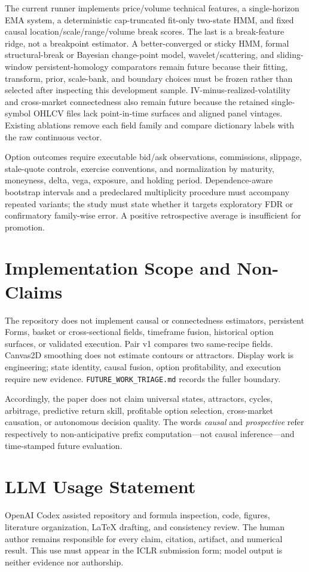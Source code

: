 \documentclass{article}
\begin{document}
The current runner implements price/volume technical features, a single-horizon EMA system, a deterministic cap-truncated fit-only two-state HMM, and fixed causal location/scale/range/volume break scores. The last is a break-feature ridge, not a breakpoint estimator. A better-converged or sticky HMM, formal structural-break or Bayesian change-point model, wavelet/scattering, and sliding-window persistent-homology comparators \citep{pereaharer2015sliding,gideakatz2018tda} remain future because their fitting, transform, prior, scale-bank, and boundary choices must be frozen rather than selected after inspecting this development sample. IV-minus-realized-volatility and cross-market connectedness also remain future because the retained single-symbol OHLCV files lack point-in-time surfaces and aligned panel vintages. Existing ablations remove each field family and compare dictionary labels with the raw continuous vector.

Option outcomes require executable bid/ask observations, commissions, slippage, stale-quote controls, exercise conventions, and normalization by maturity, moneyness, delta, vega, exposure, and holding period. Dependence-aware bootstrap intervals and a predeclared multiplicity procedure must accompany repeated variants; the study must state whether it targets exploratory FDR or confirmatory family-wise error. A positive retrospective average is insufficient for promotion.

\section{Implementation Scope and Non-Claims}

The repository does not implement causal or connectedness estimators, persistent Forms, basket or cross-sectional fields, timeframe fusion, historical option surfaces, or validated execution. Pair v1 compares two same-recipe fields. Canvas2D smoothing does not estimate contours or attractors. Display work is engineering; state identity, causal fusion, option profitability, and execution require new evidence. \texttt{FUTURE\_WORK\_TRIAGE.md} records the fuller boundary.

Accordingly, the paper does not claim universal states, attractors, cycles, arbitrage, predictive return skill, profitable option selection, cross-market causation, or autonomous decision quality. The words \emph{causal} and \emph{prospective} refer respectively to non-anticipative prefix computation---not causal inference---and time-stamped future evaluation.

\section{LLM Usage Statement}

OpenAI Codex assisted repository and formula inspection, code, figures, literature organization, LaTeX drafting, and consistency review. The human author remains responsible for every claim, citation, artifact, and numerical result. This use must appear in the ICLR submission form; model output is neither evidence nor authorship.
\end{document}
